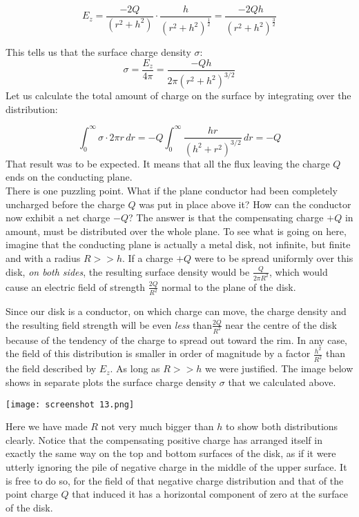 \documentclass[svgnames]{article}
\begin{document}
\[ E_z = \frac{-2Q}{(r^2+h^2)} \cdot \frac{h}{(r^2 + h^2)^{\frac{1}{2}}}
= \frac{-2Qh}{(r^2 + h^2)^\frac{3}{2}} \]

This tells us that the surface charge density $\sigma$: 
\[
  \sigma = \frac{E_z}{4\pi} = \frac{-Qh}{2\pi(r^2 + h^2)^{3/2}}
\] 
Let us calculate the total amount of charge on the surface by integrating over
the distribution: 

\[
\int_{0}^{\infty} \sigma \cdot 2\pi r \, dr = -Q \int_{0}^{\infty}
\frac{hr}{(h^2 + r^2)^{3/2}} \, dr = -Q  
\] 
That result was to be expected. It means that all the flux leaving the charge
$Q$ ends on the conducting plane. \\
There is one puzzling point. What if the plane conductor had been completely
uncharged before the charge $Q$ was put in place above it? How can the
conductor now exhibit a net charge $-Q$? The answer is that the compensating
charge $+Q$ in amount, must be distributed over the whole plane. To see what is
going on here, imagine that the conducting plane is actually a metal disk, not
infinite, but finite and with a radius $R >> h$. If a charge $+Q$ were to be
spread uniformly over this disk, \textit{on both sides}, the resulting surface
density would be $\frac{Q}{2\pi R^2}$, which would cause an electric field of
strength $\frac{2Q}{R^2}$ normal to the plane of the disk. 


Since our disk is a conductor, on which charge can move, the charge density and
the resulting field strength will be even \textit{less} than$ \frac{2Q}{R^2}$
near the centre of the disk because of the tendency of the charge to spread out
toward the rim. In any case, the field of this distribution is smaller in order
of magnitude by a factor $\frac{h^2}{R^2}$ than the field described by $E_z$.
As long as $R>>h$ we were justified. The image below shows in separate plots
the surface charge density $\sigma$ that we calculated above. 

\begin{center}
\texttt{[image: screenshot 13.png]}
\end{center}

Here we have made $R$ not very much bigger than $h$ to show both distributions
clearly. Notice that the compensating positive charge has arranged itself in
exactly the same way on the top and bottom surfaces of the disk, as if it were
utterly ignoring the pile of negative charge in the middle of the upper
surface. It is free to do so, for the field of that negative charge
distribution and that of the point charge $Q$ that induced it has a horizontal
component of zero at the surface of the disk. \\
\end{document}

